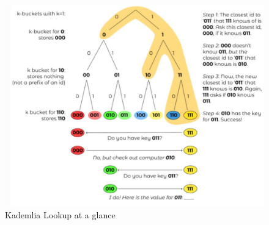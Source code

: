 \begin{figure}[htbp]
   \centering
   \includegraphics{images/kademlia_lookup.png}
   \caption{Kademlia Lookup at a glance}
   \label{fig:kademlia_lookup}
\end{figure}

